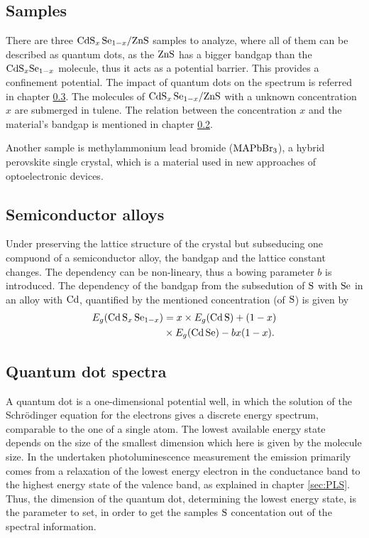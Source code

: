 \subsection{Samples}
\label{sec:samples}

There are three $\ce{CdS_x Se_{1-x}/ZnS}$ samples to analyze, where all of them can be described as quantum dots, as the $\ce{ZnS}$ has a bigger bandgap than the $\ce{CdS_xSe_{1-x}}$ molecule, 
thus it acts as a potential barrier.
This provides a confinement potential. The impact of quantum dots on the spectrum is referred in chapter \ref{sec:QD}.
The molecules of $\ce{CdS_x Se_{1-x}/ZnS}$ with a unknown concentration $x$ are submerged in tulene.
The relation between the concentration $x$ and the material's bandgap is mentioned in chapter \ref{sec:SemAll}.

Another sample is methylammonium lead bromide ($\ce{MAPbBr_3}$), a hybrid perovskite single crystal, which is a material used in new approaches of optoelectronic devices.

\subsection{Semiconductor alloys}
\label{sec:SemAll}

Under preserving the lattice structure of the crystal but subseducing one compuond of a semiconductor alloy, the bandgap and the lattice constant changes.
The dependency can be non-lineary, thus a bowing parameter $b$ is introduced. 
The dependency of the bandgap from the subsedution of $\ce{S}$ with $\ce{Se}$ in an alloy with $\ce{Cd}$, quantified by the mentioned concentration (of $\ce{S}$) is given by
\begin{align*}
    E_g(\ce{Cd S_x Se_{1-x}}) &= x \times E_g(\ce{Cd S}) + (1-x) \\ &\times E_g(\ce{Cd Se}) - bx(1-x).
\end{align*}

\subsection{Quantum dot spectra}
\label{sec:QD}

A quantum dot is a one-dimensional potential well, in which the solution of the Schrödinger equation for the electrons gives a discrete energy spectrum, comparable to the one of a single atom.
The lowest available energy state depends on the size of the smallest dimension which here is given by the molecule size.
In the undertaken photoluminescence measurement the emission primarily comes from a relaxation of the lowest energy electron in the conductance band to the highest energy state of the valence band, as explained in chapter \ref{sec:PLS}.
Thus, the dimension of the quantum dot, determining the lowest energy state, is the parameter to set, in order to get the samples $\ce{S}$ concentation out of the spectral information.

